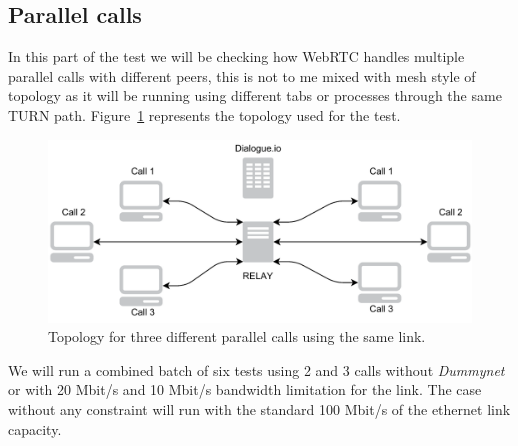 \subsection{Parallel calls}

In this part of the test we will be checking how WebRTC handles multiple parallel calls with different peers, this is not to me mixed with mesh style of topology as it will be running using different tabs or processes through the same TURN path. Figure~\ref{fig:parallelCalls} represents the topology used for the test.

 \begin{figure}[h]
  \centering
    \includegraphics[width=1\textwidth]{./figures/ParallelCalls.pdf}
      \caption[Topology for three different parallel calls using the same link]{Topology for three different parallel calls using the same link.}
	\label{fig:parallelCalls}
\end{figure}

We will run a combined batch of six tests using 2 and 3 calls without {\it Dummynet} or with 20 Mbit/s and 10 Mbit/s bandwidth limitation for the link. The case without any constraint will run with the standard 100 Mbit/s of the ethernet link capacity.
